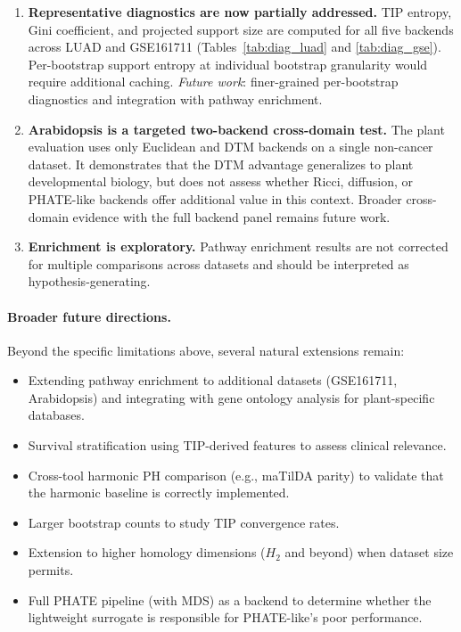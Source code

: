 \documentclass[11pt]{article}
\begin{document}
\begin{enumerate}[leftmargin=1.5em]
\item \textbf{Representative diagnostics are now partially addressed.}
TIP entropy, Gini coefficient, and projected support size are computed for all five backends across LUAD and GSE161711 (Tables~\ref{tab:diag_luad} and \ref{tab:diag_gse}).
Per-bootstrap support entropy at individual bootstrap granularity would require additional caching.
\emph{Future work}: finer-grained per-bootstrap diagnostics and integration with pathway enrichment.

\item \textbf{Arabidopsis is a targeted two-backend cross-domain test.}
The plant evaluation uses only Euclidean and DTM backends on a single non-cancer dataset.
It demonstrates that the DTM advantage generalizes to plant developmental biology, but does not assess whether Ricci, diffusion, or PHATE-like backends offer additional value in this context.
Broader cross-domain evidence with the full backend panel remains future work.

\item \textbf{Enrichment is exploratory.}
Pathway enrichment results are not corrected for multiple comparisons across datasets and should be interpreted as hypothesis-generating.
\end{enumerate}

\paragraph{Broader future directions.}
Beyond the specific limitations above, several natural extensions remain:
\begin{itemize}[leftmargin=1.5em]
\item Extending pathway enrichment to additional datasets (GSE161711, Arabidopsis) and integrating with gene ontology analysis for plant-specific databases.
\item Survival stratification using TIP-derived features to assess clinical relevance.
\item Cross-tool harmonic PH comparison (e.g., maTilDA parity) to validate that the harmonic baseline is correctly implemented.
\item Larger bootstrap counts to study TIP convergence rates.
\item Extension to higher homology dimensions ($H_2$ and beyond) when dataset size permits.
\item Full PHATE pipeline (with MDS) as a backend to determine whether the lightweight surrogate is responsible for PHATE-like's poor performance.
\end{itemize}
\end{document}
